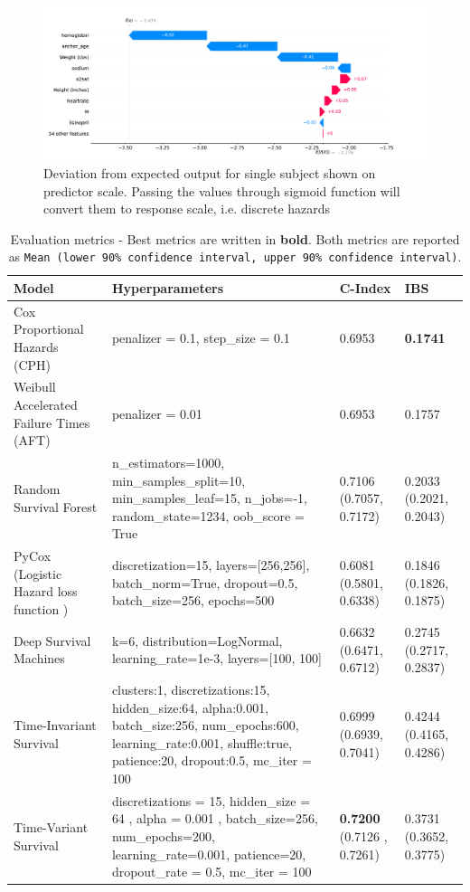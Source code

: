 \documentclass[%
 twocolumn,
 reprint,
 amsmath,amssymb,
 aps,nofootinbib
]{revtex4-2}
\begin{document}
\begin{figure}
  \centering
  \includegraphics[width=\textwidth]{shap_fig.pdf}
  \caption[SHAP waterfall chart]{Deviation from expected output for single subject shown on predictor scale. Passing the values through sigmoid function will convert them to response scale, i.e. discrete hazards}
  \label{fig:shap}
\end{figure}

\begin{table}
  \centering
  \begin{tabular}{|p{4cm}|p{6cm}|p{3.5cm}|p{3.5cm}|}
     \hline
    \textbf{Model} & \textbf{Hyperparameters} & \textbf{C-Index} & \textbf{IBS} \\
    \hline
    Cox Proportional Hazards (CPH) & \raggedright penalizer = 0.1, step\_size = 0.1 & 0.6953 & \textbf{0.1741}\\
    \hline
    Weibull Accelerated Failure Times (AFT) & \raggedright  penalizer = 0.01  & 0.6953 & 0.1757\\
    \hline
    Random Survival Forest & \raggedright n\_estimators=1000, min\_samples\_split=10, min\_samples\_leaf=15, n\_jobs=-1, random\_state=1234, oob\_score = True  & 0.7106 (0.7057, 0.7172) & 0.2033 (0.2021, 0.2043)\\
    \hline
    PyCox (Logistic Hazard loss function \cite{kvamme_continuous_2019}) & \raggedright discretization=15, layers=[256,256],  batch\_norm=True, dropout=0.5, batch\_size=256, epochs=500 & 0.6081 (0.5801, 0.6338)& 0.1846 (0.1826, 0.1875)\\
    \hline
    Deep Survival Machines & \raggedright k=6, distribution=LogNormal, learning\_rate=1e-3, layers=[100, 100] & 0.6632 (0.6471, 0.6712) & 0.2745 (0.2717, 0.2837)\\
    \hline
    Time-Invariant Survival & \raggedright clusters:1, discretizations:15, hidden\_size:64, alpha:0.001, batch\_size:256, num\_epochs:600, learning\_rate:0.001, shuffle:true, patience:20, dropout:0.5, mc\_iter = 100 & 0.6999 (0.6939, 0.7041) &0.4244 (0.4165, 0.4286) \\
    \hline
    Time-Variant Survival & \raggedright discretizations = 15, hidden\_size = 64 , alpha = 0.001 , batch\_size=256, num\_epochs=200, learning\_rate=0.001, patience=20, dropout\_rate = 0.5, mc\_iter = 100  & \textbf{0.7200} (0.7126 , 0.7261) & 0.3731 (0.3652, 0.3775)\\
    \hline
  \end{tabular}
  \caption[Experiment results]{Evaluation metrics - Best metrics are written in \textbf{bold}. Both metrics are reported as \texttt{Mean (lower 90\% confidence interval, upper 90\% confidence interval)}.}
  \label{tab:eval}
\end{table}
\end{document}
